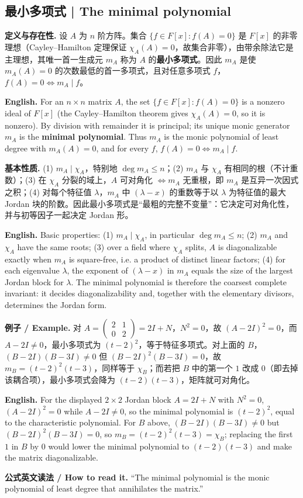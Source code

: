 \documentclass[UTF8,11pt,a4paper]{ctexart}
\newcommand{\EN}[1]{\par\noindent\textbf{English.} #1\par}
\newcommand{\READ}[1]{\par\noindent\textbf{公式英文读法 / How to read it.} #1\par}
\newcommand{\EX}[2]{\par\noindent\textbf{例子 / Example.} #1\par\EN{#2}}
\begin{document}
\subsection{最小多项式 | The minimal polynomial}
\noindent\textbf{定义与存在性.} 设 $A$ 为 $n$ 阶方阵。集合 $\{f\in F[x]:f(A)=0\}$ 是 $F[x]$ 的非零理想（Cayley--Hamilton 定理保证 $\chi_A(A)=0$，故集合非零），由带余除法它是主理想，其唯一首一生成元 $m_A$ 称为 $A$ 的\textbf{最小多项式}。因此 $m_A$ 是使 $m_A(A)=0$ 的次数最低的首一多项式，且对任意多项式 $f$，$f(A)=0\iff m_A\mid f$。
\EN{For an $n\times n$ matrix $A$, the set $\{f\in F[x]:f(A)=0\}$ is a nonzero ideal of $F[x]$ (the Cayley--Hamilton theorem gives $\chi_A(A)=0$, so it is nonzero). By division with remainder it is principal; its unique monic generator $m_A$ is the \textbf{minimal polynomial}. Thus $m_A$ is the monic polynomial of least degree with $m_A(A)=0$, and for every $f$, $f(A)=0\iff m_A\mid f$.}
\noindent\textbf{基本性质.} (1) $m_A\mid\chi_A$，特别地 $\deg m_A\le n$；(2) $m_A$ 与 $\chi_A$ 有相同的根（不计重数）；(3) 在 $\chi_A$ 分裂的域上，$A$ 可对角化 $\iff m_A$ 无重根，即 $m_A$ 是互异一次因式之积；(4) 对每个特征值 $\lambda$，$m_A$ 中 $(\lambda-x)$ 的重数等于以 $\lambda$ 为特征值的最大 Jordan 块的阶数。因此最小多项式是“最粗的完整不变量”：它决定可对角化性，并与初等因子一起决定 Jordan 形。
\EN{Basic properties: (1) $m_A\mid\chi_A$, in particular $\deg m_A\le n$; (2) $m_A$ and $\chi_A$ have the same roots; (3) over a field where $\chi_A$ splits, $A$ is diagonalizable exactly when $m_A$ is square-free, i.e. a product of distinct linear factors; (4) for each eigenvalue $\lambda$, the exponent of $(\lambda-x)$ in $m_A$ equals the size of the largest Jordan block for $\lambda$. The minimal polynomial is therefore the coarsest complete invariant: it decides diagonalizability and, together with the elementary divisors, determines the Jordan form.}
\EX{对 $A=\begin{pmatrix}2&1\\0&2\end{pmatrix}=2I+N$，$N^2=0$，故 $(A-2I)^2=0$，而 $A-2I\ne0$，最小多项式为 $(t-2)^2$，等于特征多项式。对上面的 $B$，$(B-2I)(B-3I)\ne0$ 但 $(B-2I)^2(B-3I)=0$，故 $m_B=(t-2)^2(t-3)$，同样等于 $\chi_B$；而若把 $B$ 中的第一个 $1$ 改成 $0$（即去掉该耦合项），最小多项式会降为 $(t-2)(t-3)$，矩阵就可对角化。}{For the displayed $2\times2$ Jordan block $A=2I+N$ with $N^2=0$, $(A-2I)^2=0$ while $A-2I\ne0$, so the minimal polynomial is $(t-2)^2$, equal to the characteristic polynomial. For $B$ above, $(B-2I)(B-3I)\ne0$ but $(B-2I)^2(B-3I)=0$, so $m_B=(t-2)^2(t-3)=\chi_B$; replacing the first $1$ in $B$ by $0$ would lower the minimal polynomial to $(t-2)(t-3)$ and make the matrix diagonalizable.}
\READ{``The minimal polynomial is the monic polynomial of least degree that annihilates the matrix.''}
\end{document}
